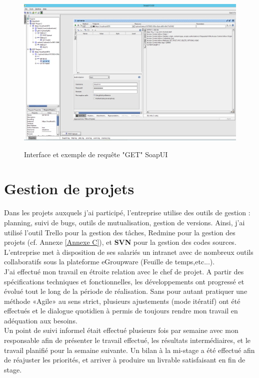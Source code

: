 \begin{center}
\begin{figure}[h] \centering
\includegraphics[width=16cm]{images/soapUI_getById_sansResponse_small.png}\\
\caption{\label{SoapUIGet} Interface et exemple de requête "GET" SoapUI}
\end{figure}
\end{center}


\section{Gestion de projets}

Dans les projets auxquels j'ai participé, l'entreprise utilise des outils de gestion : planning, suivi de bugs, outils de mutualisation, gestion de versions. Ainsi, j'ai utilisé l'outil Trello pour la gestion des tâches, Redmine pour la gestion des projets (cf. Annexe \ref{Annexe C}), et \textbf{SVN} pour la gestion des codes sources. L'entreprise met à disposition de ses salariés un intranet avec de nombreux outils collaboratifs sous la plateforme eGroupware (Feuille de temps,etc...).\\

J'ai effectué mon travail en étroite relation avec le chef de projet. A partir des spécifications techniques et fonctionnelles, les développements ont progressé et évolué tout le long de la période de réalisation. Sans pour autant pratiquer une méthode «Agile» au sens strict, plusieurs ajustements (mode itératif) ont été effectués et le dialogue quotidien à permis de toujours rendre mon travail en adéquation aux besoins. \\

Un point de suivi informel était effectué plusieurs fois par semaine avec mon responsable afin de présenter le travail effectué, les résultats intermédiaires, et le travail planifié pour la semaine suivante. Un bilan à la mi-stage a été effectué afin de réajuster les priorités, et arriver à produire un livrable satisfaisant en fin de stage. \\


